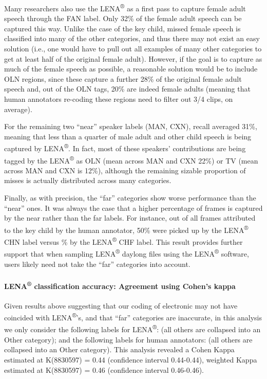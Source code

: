 \documentclass[english,table,man,floatsintext]{apa6}
\let\oldparagraph\paragraph
\renewcommand{\paragraph}[1]{\oldparagraph{#1}\mbox{}}
\begin{document}
Many researchers also use the LENA\textsuperscript{®} as a first pass to
capture female adult speech through the FAN label. Only 32\% of the
female adult speech can be captured this way. Unlike the case of the key
child, missed female speech is classified into many of the other
categories, and thus there may not exist an easy solution (i.e., one
would have to pull out all examples of many other categories to get at
least half of the original female adult). However, if the goal is to
capture as much of the female speech as possible, a reasonable solution
would be to include OLN regions, since these capture a further 28\% of
the original female adult speech and, out of the OLN tags, 20\% are
indeed female adults (meaning that human annotators re-coding these
regions need to filter out 3/4 clips, on average).

For the remaining two \enquote{near} speaker labels (MAN, CXN), recall
averaged 31\%, meaning that less than a quarter of male adult and other
child speech is being captured by LENA\textsuperscript{®}. In fact, most
of these speakers' contributions are being tagged by the
LENA\textsuperscript{®} as OLN (mean across MAN and CXN 22\%) or TV
(mean across MAN and CXN is 12\%), although the remaining sizable
proportion of misses is actually distributed across many categories.

Finally, as with precision, the \enquote{far} categories show worse
performance than the \enquote{near} ones. It was always the case that a
higher percentage of frames is captured by the near rather than the far
labels. For instance, out of all frames attributed to the key child by
the human annotator, 50\% were picked up by the LENA\textsuperscript{®}
CHN label versus \% by the LENA\textsuperscript{®} CHF label. This
result provides further support that when sampling
LENA\textsuperscript{®} daylong files using the LENA\textsuperscript{®}
software, users likely need not take the \enquote{far} categories into
account.

\paragraph{\texorpdfstring{LENA\textsuperscript{®} classification
accuracy: Agreement using Cohen's
kappa}{LENA® classification accuracy: Agreement using Cohen's kappa}}\label{lena-classification-accuracy-agreement-using-cohens-kappa}

Given results above suggesting that our coding of electronic may not
have coincided with LENA\textsuperscript{®}'s, and that \enquote{far}
categories are inaccurate, in this analysis we only consider the
following labels for LENA\textsuperscript{®}: (all others are collapsed
into an Other category); and the following labels for human annotators:
(all others are collapsed into an Other category). This analysis
revealed a Cohen Kappa estimated at K(8830597) = 0.44 (confidence
interval 0.44-0.44), weighted Kappa estimated at K(8830597) = 0.46
(confidence interval 0.46-0.46).
\end{document}
